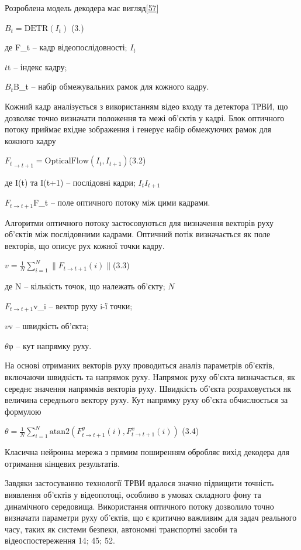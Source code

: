 \documentclass[
]{article}
\begin{document}
Розроблена модель декодера має вигляд{[}\hyperref[_Ref221290074]{57}{]}

\(B_{t} = \text{DETR}\left( I_{t} \right)\) (3.)

де F\_t -- кадр відеопослідовності; \(I_{t}\)

\(t\)t -- індекс кадру;

\(B_{t}\)B\_t -- набір обмежувальних рамок для кожного кадру.

Кожний кадр аналізується з використанням відео входу та детектора ТРВИ, що дозволяє точно визначати положення та межі об'єктів у кадрі. Блок оптичного потоку приймає вхідне зображення і генерує набір обмежуючих рамок для кожного кадру

\({F_{t}}_{\rightarrow t + 1} = \text{OpticalFlow}\left( I_{t},I_{t + 1} \right)\)(3.2)

де I(t) та I(t+1) -- послідовні кадри; \(I_{t}I_{t + 1}\)

\(F_{t \rightarrow t + 1}\)F\_t -- поле оптичного потоку між цими кадрами.

Алгоритми оптичного потоку застосовуються для визначення векторів руху об'єктів між послідовними кадрами. Оптичний потік визначається як поле векторів, що описує рух кожної точки кадру.

\(v = \frac{1}{N}\sum_{i = 1}^{N}{\parallel F_{t \rightarrow t + 1}(i) \parallel}\)(3.3)

де N -- кількість точок, що належать об'єкту; \(N\)

\(F_{t \rightarrow t + 1}\)v\_i -- вектор руху i-ї точки;

\(v\)v -- швидкість об'єкта;

\(\theta\)φ -- кут напрямку руху.

На основі отриманих векторів руху проводиться аналіз параметрів об'єктів, включаючи швидкість та напрямок руху. Напрямок руху об'єкта визначається, як середнє значення напрямків векторів руху. Швидкість об'єкта розраховується як величина середнього вектору руху. Кут напрямку руху об'єкта обчислюється за формулою

\(\theta = \frac{1}{N}\sum_{i = 1}^{N}{\text{atan2}\left( F_{t \rightarrow t + 1}^{y}(i),F_{t \rightarrow t + 1}^{x}(i) \right)}\) (3.4)

Класична нейронна мережа з прямим поширенням обробляє вихід декодера для отримання кінцевих результатів.

Завдяки застосуванню технології ТРВИ вдалося значно підвищити точність виявлення об'єктів у відеопотоці, особливо в умовах складного фону та динамічного середовища. Використання оптичного потоку дозволило точно визначати параметри руху об'єктів, що є критично важливим для задач реального часу, таких як системи безпеки, автономні транспортні засоби та відеоспостереження 14; 45; 52.
\end{document}
